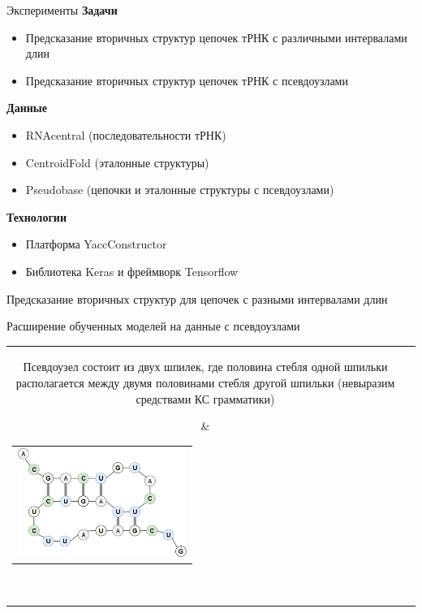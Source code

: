 \documentclass{beamer}
\begin{document}
\begin{frame}{Эксперименты}
\textbf{Задачи}  
\begin{itemize}
    \item Предсказание вторичных структур цепочек тРНК с различными интервалами длин
    \item Предсказание вторичных структур цепочек тРНК с псевдоузлами
\end{itemize} 

\vspace{6mm}
\textbf{Данные}
\begin{itemize}
    \item RNAcentral (последовательности тРНК)
    \item CentroidFold (эталонные структуры)
    \item Pseudobase (цепочки и эталонные структуры с псевдоузлами)
\end{itemize}

\vspace{6mm}

\textbf{Технологии}
\begin{itemize}
    \item Платформа YaccConstructor
    \item Библиотека Keras и фреймворк Tensorflow
\end{itemize}
\vspace{6mm}

\end{frame}

\begin{frame}{Предсказание вторичных структур для цепочек с разными интервалами длин}


\end{frame}

\begin{frame}{Расширение обученных моделей на данные с псевдоузлами}
\begin{tabular}{cl}  
    \parbox{0.45\linewidth}{
Псевдоузел состоит из двух шпилек, где половина стебля одной шпильки располагается между двумя половинами стебля другой шпильки (невыразим средствами КС грамматики)
    }
    & \begin{tabular}{l}
        \includegraphics[width=5.5cm]{pics/pseudoknot.png}
    \end{tabular}  \\
\end{tabular}
\vspace{6mm}



\end{frame}
\end{document}
